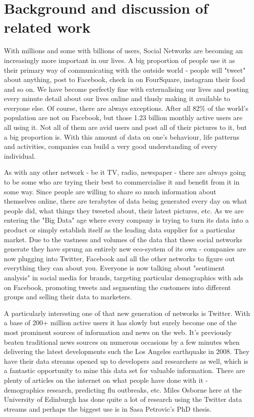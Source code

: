 \documentclass[minf,frontabs,twoside,singlespacing,parskip]{infthesis}
\begin{document}
\chapter{Background and discussion of related work}


With millions and some with billions of users, Social Networks are becoming an increasingly more important in our lives. A big proportion of people use it as their primary way of communicating with the outside world - people will "tweet" about anything, post to Facebook, check in on FourSquare, instagram their food and so on. We have become perfectly fine with externalising our lives and posting every minute detail about our lives online and thusly making it available to everyone else. 
Of course, there are always exceptions. After all 82\% of the world's population are not on Facebook, but those 1.23 billion monthly active users are all using it. Not all of them are avid users and post all of their pictures to it, but a big proportion is. With this amount of data on one's behaviour, life patterns and activities, companies can build a very good understanding of every individual. 


As with any other network - be it TV, radio, newspaper - there are always going to be some who are trying their best to commercialise it and benefit from it in some way. Since people are willing to share so much information about themselves online, there are terabytes of data being generated every day on what people did, what things they tweeted about, their latest pictures, etc. As we are entering the "Big Data" age where every company is trying to turn its data into a product or simply establish itself as the leading data supplier for a particular market. Due to the vastness and volumes of the data that these social networks generate they have sprung an entirely new eco-system of its own - companies are now plugging into Twitter, Facebook and all the other networks to figure out everything they can about you. Everyone is now talking about "sentiment analysis" in social media for brands, targeting particular demographics with ads on Facebook, promoting tweets and segmenting the customers into different groups and selling their data to marketers.


A particularly interesting one of that new generation of networks is Twitter. With a base of 200+ million active users it has slowly but surely become one of the most prominent sources of information and news on the web. It's previously beaten traditional news sources on numerous occasions by a few minutes when delivering the latest developments such the Los Angeles earthquake in 2008. \cite{TwitterNewsWire} They have their data streams opened up to developers and researchers as well, which is a fantastic opportunity to mine this data set for valuable information. There are plenty of articles on the internet on what people have done with it - demographics research, predicting flu outbreaks, etc. \cite{TwitterResearch} Miles Osborne here at the University of Edinburgh has done quite a lot of research using the Twitter data streams  \cite{Miles} and perhaps the biggest use is in Sasa Petrovic's PhD thesis. \cite{Petrovic2012}
\end{document}

